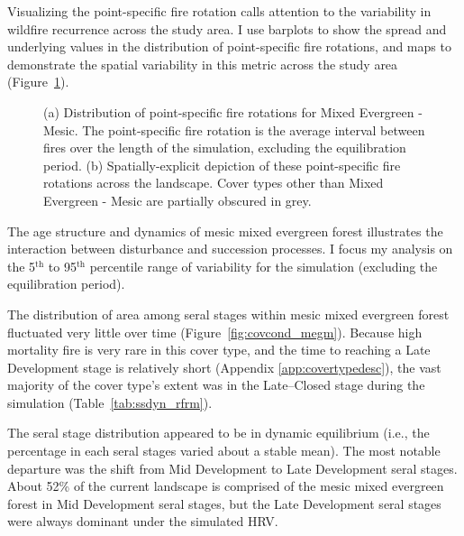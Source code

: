 Visualizing the point-specific fire rotation calls attention to the variability in wildfire recurrence across the study area. I use barplots to show the spread and underlying values in the distribution of point-specific fire rotations, and maps to demonstrate the spatial variability in this metric across the study area (Figure~\ref{fig:preturn_megm}).

\begin{figure}[!htbp]
  \centering
  \caption{(a) Distribution of point-specific fire rotations for Mixed Evergreen - Mesic. The point-specific fire rotation is the average interval between fires over the length of the simulation, excluding the equilibration period. (b) Spatially-explicit depiction of these point-specific fire rotations across the landscape. Cover types other than Mixed Evergreen - Mesic are partially obscured in grey.}
    \label{fig:preturn_megm}
\end{figure}

The age structure and dynamics of mesic mixed evergreen forest illustrates the interaction between disturbance and succession processes. I focus my analysis on the 5$^{\text{th}}$ to 95$^{\text{th}}$ percentile range of variability for the simulation (excluding the equilibration period). %

The distribution of area among seral stages within mesic mixed evergreen forest fluctuated very little over time (Figure~\ref{fig:covcond_megm}). Because high mortality fire is very rare in this cover type, and the time to reaching a Late Development stage is relatively short (Appendix \ref{app:covertypedesc}), the vast majority of the cover type's extent was in the Late--Closed stage during the simulation (Table~\ref{tab:ssdyn_rfrm}). %

The seral stage distribution appeared to be in dynamic equilibrium (i.e., the percentage in each seral stages varied about a stable mean). The most notable departure was the shift from Mid Development to Late Development seral stages. About 52\% of the current landscape is comprised of the mesic mixed evergreen forest in Mid Development seral stages, but the Late Development seral stages were always dominant under the simulated HRV. 

